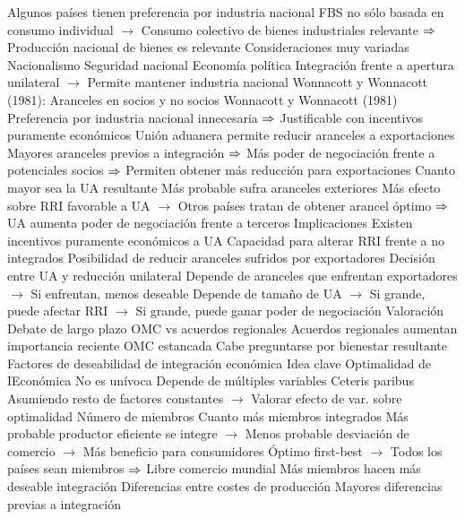 \documentclass{nuevotema}
\begin{document}
\begin{esquemal}
				\4 Algunos países tienen preferencia por industria nacional
				\4[] FBS no sólo basada en consumo individual
				\4[] $\to$ Consumo colectivo de bienes industriales relevante
				\4[] $\then$ Producción nacional de bienes es relevante
				\4 Consideraciones muy variadas
				\4[] Nacionalismo
				\4[] Seguridad nacional
				\4[] Economía política
				\4 Integración frente a apertura unilateral
				\4[] $\to$ Permite mantener industria nacional
			\3 Wonnacott y Wonnacott (1981): Aranceles en socios y no socios
				\4 Wonnacott y Wonnacott (1981)
				\4 Preferencia por industria nacional innecesaria
				\4[] $\then$ Justificable con incentivos puramente económicos
				\4 Unión aduanera permite reducir aranceles a exportaciones
				\4[] Mayores aranceles previos a integración
				\4[] $\then$ Más poder de negociación frente a potenciales socios
				\4[] $\then$ Permiten obtener más reducción para exportaciones
				\4 Cuanto mayor sea la UA resultante
				\4[] Más probable sufra aranceles exteriores
				\4[] Más efecto sobre RRI favorable a UA
				\4[] $\to$ Otros países tratan de obtener arancel óptimo
				\4[] $\then$ UA aumenta poder de negociación frente a terceros
			\3 Implicaciones
				\4 Existen incentivos puramente económicos a UA
				\4[] Capacidad para alterar RRI frente a no integrados
				\4[] Posibilidad de reducir aranceles sufridos por exportadores
				\4 Decisión entre UA y reducción unilateral
				\4[] Depende de aranceles que enfrentan exportadores
				\4[] $\to$ Si enfrentan, menos deseable
				\4[] Depende de tamaño de UA
				\4[] $\to$ Si grande, puede afectar RRI
				\4[] $\to$ Si grande, puede ganar poder de negociación
			\3 Valoración
				\4 Debate de largo plazo OMC vs acuerdos regionales
				\4 Acuerdos regionales aumentan importancia reciente
				\4 OMC estancada
				\4 Cabe preguntarse por bienestar resultante
		\2 Factores de deseabilidad de integración económica
			\3 Idea clave
				\4 Optimalidad de IEconómica
				\4[] No es unívoca
				\4 Depende de múltiples variables
				\4 Ceteris paribus
				\4[] Asumiendo resto de factores constantes
				\4[] $\to$ Valorar efecto de var. sobre optimalidad
			\3 Número de miembros
				\4 Cuanto más miembros integrados
				\4[] Más probable productor eficiente se integre
				\4[] $\to$ Menos probable desviación de comercio
				\4[] $\to$ Más beneficio para consumidores
				\4 Óptimo first-best
				\4[] $\to$ Todos los países sean miembros
				\4[] $\then$ Libre comercio mundial
				\4[$\then$] Más miembros hacen más deseable integración
			\3 Diferencias entre costes de producción
				\4 Mayores diferencias previas a integración

\end{esquemal}
\end{document}
